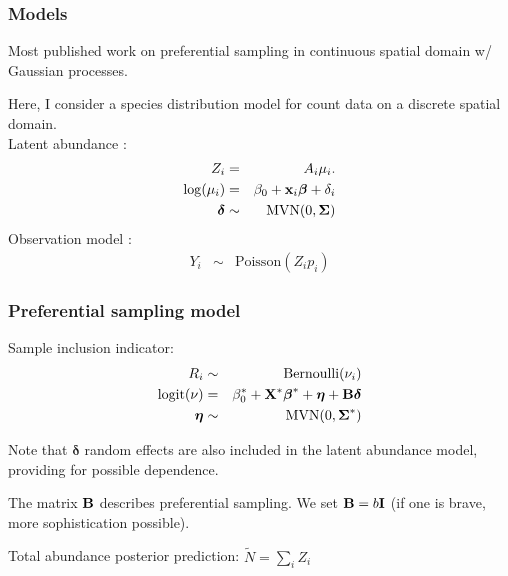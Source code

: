 \documentclass[serif,mathserif]{beamer}
\begin{document}
\begin{frame}
  \frametitle{Models}
  \vspace{0.75cm}

  Most published work on preferential sampling in continuous spatial domain w/ Gaussian processes. \pause

 \vspace{0.25cm}
  Here, I consider a species distribution model for count data on a discrete spatial domain.\\
  \vspace{0.25cm}
   \textcolor{noaaturq}{Latent abundance }:
   \begin{eqnarray*}
      Z_i  & = & A_i \mu_i. \\
   \log(\mu_i)  & = & \beta_0 + {\bf x}_i \boldsymbol{\beta}+\delta_i \\
   \boldsymbol{\delta} & \sim & \textrm{MVN}(0,\boldsymbol{\Sigma})
   \end{eqnarray*} \pause
   \textcolor{noaaturq}{Observation model }:
   \begin{eqnarray*}
      Y_i  & \sim & \textrm{Poisson}(Z_i p_i)
   \end{eqnarray*}
\end{frame}



\begin{frame}
\frametitle{Preferential sampling model}
  \textcolor{noaaturq}{Sample inclusion indicator}:
    \begin{eqnarray*}
      R_i & \sim & \textrm{Bernoulli}(\nu_i)\\
    \textrm{logit}(\nu) & = & \beta_0^* + {\bf X}^* \boldsymbol{\beta}^*+\boldsymbol{\eta}+{\bf B} \boldsymbol{\delta} \\
      \boldsymbol{\eta} & \sim & \textrm{MVN}(0,\boldsymbol{\Sigma}^*)
    \end{eqnarray*} \pause

    \vspace{0.25cm}

    Note that $\boldsymbol{\delta}$ random effects are also included in the latent abundance model, providing for possible dependence. \pause

    \vspace{0.5cm}

    The matrix ${\bf B}$ describes preferential sampling.  We set  ${\bf B} = b{\bf I}$ (if one is brave, more sophistication possible). \pause

     \vspace{0.5cm}

    \textcolor{noaaturq}{Total abundance posterior prediction}:
    $\tilde{N} = \sum_i Z_i$

\end{frame}
\end{document}
